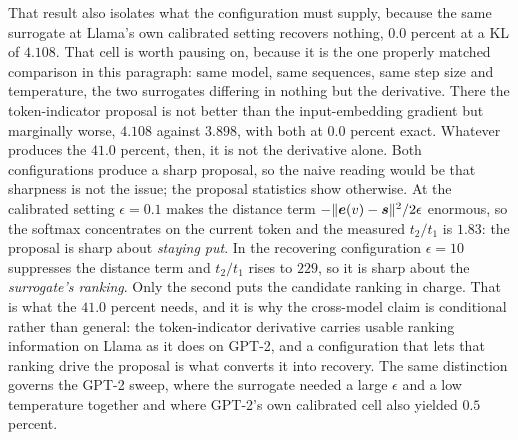 That result also isolates what the configuration must supply, because the same surrogate at Llama's own calibrated setting recovers nothing, $0.0$ percent at a KL of $4.108$. That cell is worth pausing on, because it is the one properly matched comparison in this paragraph: same model, same sequences, same step size and temperature, the two surrogates differing in nothing but the derivative. There the token-indicator proposal is not better than the input-embedding gradient but marginally worse, $4.108$ against $3.898$, with both at $0.0$ percent exact. Whatever produces the $41.0$ percent, then, it is not the derivative alone. Both configurations produce a sharp proposal, so the naive reading would be that sharpness is not the issue; the proposal statistics show otherwise. At the calibrated setting $\epsilon = 0.1$ makes the distance term $-\lVert \bm{e}(v) - \bm{s} \rVert^2 / 2\epsilon$ enormous, so the softmax concentrates on the current token and the measured $t_2/t_1$ is $1.83$: the proposal is sharp about \emph{staying put}. In the recovering configuration $\epsilon = 10$ suppresses the distance term and $t_2/t_1$ rises to $229$, so it is sharp about the \emph{surrogate's ranking}. Only the second puts the candidate ranking in charge. That is what the $41.0$ percent needs, and it is why the cross-model claim is conditional rather than general: the token-indicator derivative carries usable ranking information on Llama as it does on GPT-2, and a configuration that lets that ranking drive the proposal is what converts it into recovery. The same distinction governs the GPT-2 sweep, where the surrogate needed a large $\epsilon$ and a low temperature together and where GPT-2's own calibrated cell also yielded $0.5$ percent.

